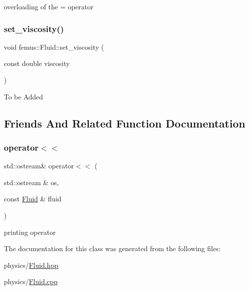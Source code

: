 overloading of the = operator \mbox{\label{classfemus_1_1_fluid_ac53b9fafcb7e64adb950186182205ba9}} 
\subsubsection{\texorpdfstring{set\+\_\+viscosity()}{set\_viscosity()}}
{\footnotesize\ttfamily void femus\+::\+Fluid\+::set\+\_\+viscosity (\begin{DoxyParamCaption}\item[{const double}]{viscosity }\end{DoxyParamCaption})}

To be Added 

\subsection{Friends And Related Function Documentation}
\mbox{\label{classfemus_1_1_fluid_a29fca4de20408057a55a836385cb66ed}} 
\subsubsection{\texorpdfstring{operator$<$$<$}{operator<<}}
{\footnotesize\ttfamily std\+::ostream\& operator$<$$<$ (\begin{DoxyParamCaption}\item[{std\+::ostream \&}]{os,  }\item[{const \mbox{\hyperlink{classfemus_1_1_fluid}{Fluid}} \&}]{fluid }\end{DoxyParamCaption})\hspace{0.3cm}{\ttfamily [friend]}}

printing operator 

The documentation for this class was generated from the following files\+:\begin{DoxyCompactItemize}
\item 
physics/\mbox{\hyperlink{_fluid_8hpp}{Fluid.\+hpp}}\item 
physics/\mbox{\hyperlink{_fluid_8cpp}{Fluid.\+cpp}}\end{DoxyCompactItemize}
